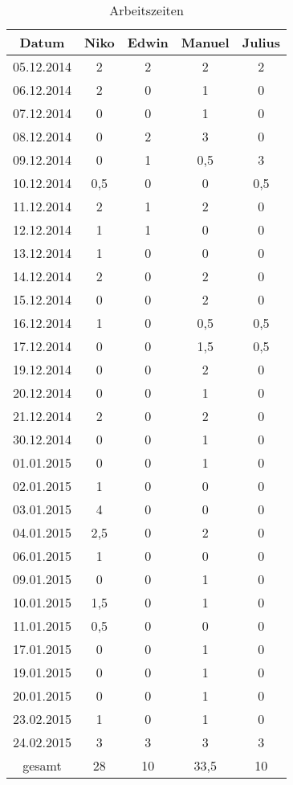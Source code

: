 \documentclass[a4paper, 11pt, titlepage]{article}
\begin{document}
\begin{table}[htbp]
\centering
\begin{tabular}{|c||c|c|c|c|}
\hline
Datum & Niko & Edwin & Manuel & Julius \\
\hline
\hline
05.12.2014 & 2 & 2 & 2 & 2 \\
\hline
06.12.2014 & 2 & 0 & 1 & 0 \\
\hline
07.12.2014 & 0 & 0 & 1 & 0 \\
\hline
08.12.2014 & 0 & 2 & 3 & 0 \\
\hline
09.12.2014 & 0 & 1 & 0{,}5 & 3 \\
\hline
10.12.2014 & 0{,}5 & 0 & 0 & 0{,}5 \\
\hline
11.12.2014 & 2 & 1 & 2 & 0 \\
\hline
12.12.2014 & 1 & 1 & 0 & 0 \\
\hline
13.12.2014 & 1 & 0 & 0 & 0 \\
\hline
14.12.2014 & 2 & 0 & 2 & 0 \\
\hline
15.12.2014 & 0 & 0 & 2 & 0 \\
\hline
16.12.2014 & 1 & 0 & 0{,}5 & 0{,}5 \\
\hline
17.12.2014 & 0 & 0 & 1{,}5 & 0{,}5 \\
\hline
19.12.2014 & 0 & 0 & 2 & 0 \\
\hline
20.12.2014 & 0 & 0 & 1 & 0 \\
\hline
21.12.2014 & 2 & 0 & 2 & 0 \\
\hline
30.12.2014 & 0 & 0 & 1 & 0 \\
\hline
01.01.2015 & 0 & 0 & 1 & 0 \\
\hline
02.01.2015 & 1 & 0 & 0 & 0 \\
\hline
03.01.2015 & 4 & 0 & 0 & 0 \\
\hline
04.01.2015 & 2{,}5 & 0 & 2 & 0 \\
\hline
06.01.2015 & 1 & 0 & 0 & 0 \\
\hline
09.01.2015 & 0 & 0 & 1 & 0 \\
\hline
10.01.2015 & 1{,}5 & 0 & 1 & 0 \\
\hline
11.01.2015 & 0{,}5 & 0 & 0 & 0 \\
\hline
17.01.2015 & 0 & 0 & 1 & 0 \\
\hline
19.01.2015 & 0 & 0 & 1 & 0 \\
\hline
20.01.2015 & 0 & 0 & 1 & 0 \\
\hline
23.02.2015 & 1 & 0 & 1 & 0 \\
\hline
24.02.2015 & 3 & 3 & 3 & 3 \\
\hline
\hline
gesamt & 28 & 10 & 33{,}5 & 10 \\
\hline
\end{tabular}
\caption{Arbeitszeiten}
\end{table}
\end{document}

